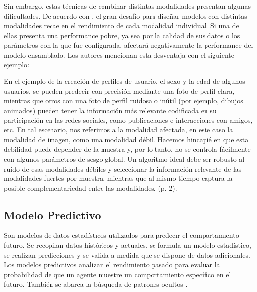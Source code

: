 Sin embargo, estas técnicas de combinar distintas modalidades presentan algunas dificultades. De acuerdo con \cite{tec_liu2018multideeplearning}, el gran desafío para diseñar modelos con distintas modalidades recae en el rendimiento de cada modalidad individual. Si una de ellas presenta una performance pobre, ya sea por la calidad de sus datos o los parámetros con la que fue configurada, afectará negativamente la performance del modelo ensamblado. Los autores mencionan esta desventaja con el siguiente ejemplo:
\begin{center}
	\begin{minipage}{0.9\linewidth}
		\vspace{5pt}%
		{\small
			En el ejemplo de la creación de perfiles de usuario, el sexo y la edad de algunos usuarios, se pueden predecir con precisión mediante una foto de perfil clara, mientras que otros con una foto de perfil ruidosa o inútil (por ejemplo, dibujos animados) pueden tener la información más relevante codificada en su participación en las redes sociales, como publicaciones e interacciones con amigos, etc. En tal escenario, nos referimos a la modalidad afectada, en este caso la modalidad de imagen, como una modalidad débil. Hacemos hincapié en que esta debilidad puede depender de la muestra y, por lo tanto, no se controla fácilmente con algunos parámetros de sesgo global. Un algoritmo ideal debe ser robusto al ruido de esas modalidades débiles y seleccionar la información relevante de las modalidades fuertes por muestra, mientras que al mismo tiempo captura la posible complementariedad entre las modalidades. (p. 2).
		}
		\vspace{5pt}%
	\end{minipage}
\end{center}

\subsection{Modelo Predictivo}

Son modelos de datos estadísticos utilizados para predecir el comportamiento futuro. Se recopilan datos históricos y actuales, se formula un modelo estadístico, se realizan predicciones y se valida a medida que se dispone de datos adicionales. Los modelos predictivos analizan el rendimiento pasado para evaluar la probabilidad de que un agente muestre un comportamiento específico en el futuro. También se abarca la búsqueda de patrones ocultos \parencite{gl_gartner2019pm}.

